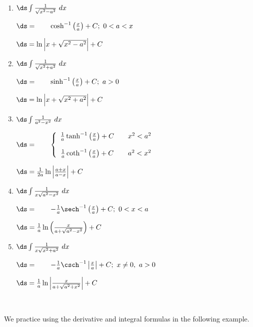 \setboxwidth{120pt}
\noindent\begin{minipage}{\specialboxlength}
{%
\begin{enumerate}
\item \parbox{70pt}{$\ds\int \frac{1}{\sqrt{x^2-a^2}}\ dx$} \parbox{180pt}{$\ds=\qquad \cosh^{-1}\left(\frac xa\right)+C;\ 0<a<x$} $\ds=\ln\Big|x+\sqrt{x^2-a^2}\Big|+C$

\item \parbox{70pt}{$\ds\int \frac{1}{\sqrt{x^2+a^2}}\ dx$} \parbox{180pt}{$\ds=\qquad \sinh^{-1}\left(\frac xa\right)+C;\ a>0$} $\ds=\ln\Big|x+\sqrt{x^2+a^2}\Big|+C$

\item \parbox{70pt}{$\ds\int \frac{1}{a^2-x^2}\ dx$} \parbox{180pt}{$\ds=\qquad \left\{\begin{array}{ccc} \frac1a\tanh^{-1}\left(\frac xa\right)+C & & x^2<a^2 \\ \\
\frac1a\coth^{-1}\left(\frac xa\right)+C & & a^2<x^2 \end{array}\right.$} $\ds=\frac1{2a}\ln\left|\frac{a+x}{a-x}\right|+C$

\item \parbox{70pt}{$\ds\int \frac{1}{x\sqrt{a^2-x^2}}\ dx $} \parbox{180pt}{$\ds=\qquad -\frac1a\sech^{-1}\left(\frac xa\right)+C;\ 0<x<a$} $\ds= \frac1a \ln\left(\frac{x}{a+\sqrt{a^2-x^2}}\right)+C $

\item	\parbox{70pt}{$\ds\int \frac{1}{x\sqrt{x^2+a^2}}\ dx $} \parbox{180pt}{$\ds=\qquad -\frac1a\csch^{-1}\left|\frac xa\right| + C;\ x\neq 0,\ a>0$}$\ds= \frac1a \ln\left|\frac{x}{a+\sqrt{a^2+x^2}}\right|+C $
\end{enumerate}
}
\end{minipage}
\restoreboxwidth
\\ \clearpage

We practice using the derivative and integral formulas in the following example.\\

